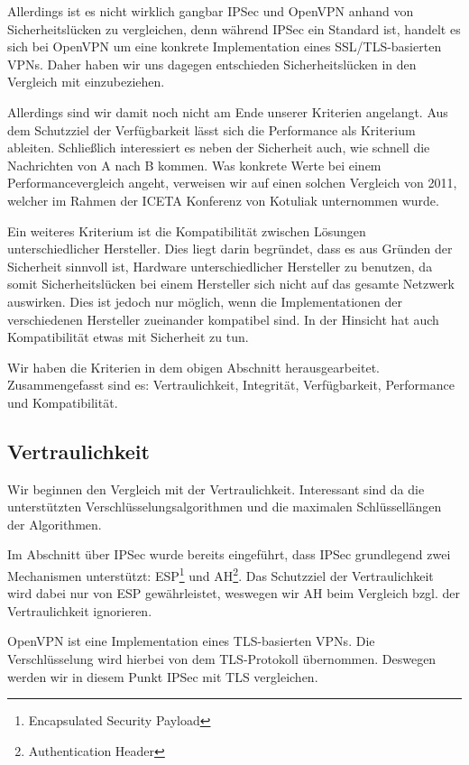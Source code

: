 \documentclass[12pt]{scrartcl}
\begin{document}
Allerdings ist es nicht wirklich gangbar IPSec und OpenVPN anhand von Sicherheitslücken zu vergleichen, denn während IPSec ein Standard ist\cite{Kent2005}, handelt es sich bei OpenVPN um eine konkrete Implementation eines SSL/TLS-basierten VPNs\cite{Kotuliak2011}. Daher haben wir uns dagegen entschieden Sicherheitslücken in den Vergleich mit einzubeziehen.

Allerdings sind wir damit noch nicht am Ende unserer Kriterien angelangt. Aus dem Schutzziel der Verfügbarkeit lässt sich die Performance als Kriterium ableiten. Schließlich interessiert es neben der Sicherheit auch, wie schnell die Nachrichten von A nach B kommen. Was konkrete Werte bei einem Performancevergleich angeht, verweisen wir auf einen solchen Vergleich von 2011, welcher im Rahmen der ICETA Konferenz von Kotuliak\cite{Kotuliak2011} unternommen wurde.

Ein weiteres Kriterium ist die Kompatibilität zwischen Lösungen unterschiedlicher Hersteller. Dies liegt darin begründet, dass es aus Gründen der Sicherheit sinnvoll ist, Hardware unterschiedlicher Hersteller zu benutzen, da somit Sicherheitslücken bei einem Hersteller sich nicht auf das gesamte Netzwerk auswirken. Dies ist jedoch nur möglich, wenn die Implementationen der verschiedenen Hersteller zueinander kompatibel sind. In der Hinsicht hat auch Kompatibilität etwas mit Sicherheit zu tun.

Wir haben die Kriterien in dem obigen Abschnitt herausgearbeitet. Zusammengefasst sind es: Vertraulichkeit, Integrität, Verfügbarkeit, Performance und Kompatibilität.

\subsection{Vertraulichkeit}
Wir beginnen den Vergleich mit der Vertraulichkeit. Interessant sind da die unterstützten Verschlüsselungsalgorithmen und die maximalen Schlüssellängen der Algorithmen.

Im Abschnitt über IPSec wurde bereits eingeführt, dass IPSec grundlegend zwei Mechanismen unterstützt: ESP\footnote{Encapsulated Security Payload} und AH\footnote{Authentication Header}. Das Schutzziel der Vertraulichkeit wird dabei nur von ESP gewährleistet, weswegen wir AH beim Vergleich bzgl. der Vertraulichkeit ignorieren.

OpenVPN ist eine Implementation eines TLS-basierten VPNs. Die Verschlüsselung wird hierbei von dem TLS-Protokoll übernommen. Deswegen werden wir in diesem Punkt IPSec mit TLS vergleichen.
\end{document}
